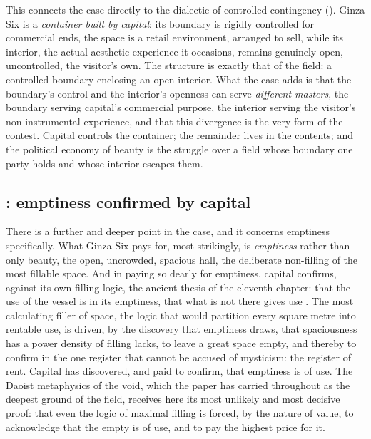 This connects the case directly to the dialectic of controlled contingency (). Ginza Six is a \emph{container built by capital}: its boundary is rigidly controlled for commercial ends, the space is a retail environment, arranged to sell, while its interior, the actual aesthetic experience it occasions, remains genuinely open, uncontrolled, the visitor's own. The structure is exactly that of the field: a controlled boundary enclosing an open interior. What the case adds is that the boundary's control and the interior's openness can serve \emph{different masters}, the boundary serving capital's commercial purpose, the interior serving the visitor's non-instrumental experience, and that this divergence is the very form of the contest. Capital controls the container; the remainder lives in the contents; and the political economy of beauty is the struggle over a field whose boundary one party holds and whose interior escapes them.

\subsection{\texorpdfstring{}{Wu zhi yi wei yong}: emptiness confirmed by capital}
\label{p21:sub:pe-emptiness}

There is a further and deeper point in the case, and it concerns emptiness specifically. What Ginza Six pays for, most strikingly, is \emph{emptiness} rather than only beauty, the open, uncrowded, spacious hall, the deliberate non-filling of the most fillable space. And in paying so dearly for emptiness, capital confirms, against its own filling logic, the ancient thesis of the eleventh chapter: that the use of the vessel is in its emptiness, that what is not there gives use \parencite{laozi1963}. The most calculating filler of space, the logic that would partition every square metre into rentable use, is driven, by the discovery that emptiness draws, that spaciousness has a power density of filling lacks, to leave a great space empty, and thereby to confirm  in the one register that cannot be accused of mysticism: the register of rent. Capital has discovered, and paid to confirm, that emptiness is of use. The Daoist metaphysics of the void, which the paper has carried throughout as the deepest ground of the field, receives here its most unlikely and most decisive proof: that even the logic of maximal filling is forced, by the nature of value, to acknowledge that the empty is of use, and to pay the highest price for it.

